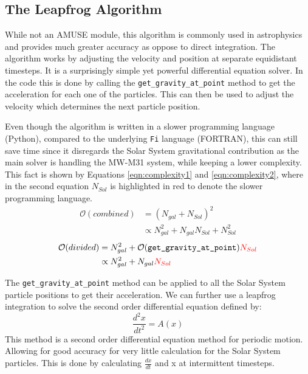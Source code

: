 \documentclass[a4paper,12pt, english]{article}
\begin{document}
\subsection{The Leapfrog Algorithm}
\label{leapfrog}
While not an AMUSE module, this algorithm is commonly used in astrophysics and provides much greater accuracy as oppose to direct integration. The algorithm works by adjusting the velocity and position at separate equidistant timesteps. It is a surprisingly simple yet powerful differential equation solver. In the code this is done by calling the \texttt{get\_gravity\_at\_point} method to get the acceleration for each one of the particles. This can then be used to adjust the velocity which determines the next particle position.\par
\smallskip
Even though the algorithm is written in a slower programming language (Python), compared to the underlying \texttt{Fi} language (FORTRAN), this can still save time since it disregards the Solar System gravitational contribution as the main solver is handling the MW-M31 system, while keeping a lower complexity. This fact is shown by Equations \ref{eqn:complexity1} and \ref{eqn:complexity2}, where in the second equation $N_{Sol}$ is highlighted in red to denote the slower programming language.
\begin{align}
    \mathcal{O}(combined) &= (N_{gal}+N_{Sol})^2 \nonumber \\ 
    &\propto N_{gal}^2 + N_{gal}N_{Sol} + N_{Sol}^2 \label{eqn:complexity1}
\end{align}
\begin{align}
    \mathcal{O}(divided) &= N_{gal}^2 +  \mathcal{O}(\texttt{get\_gravity\_at\_point})\textcolor{red}{N_{Sol}} \nonumber \\
    &\propto N_{gal}^2 + N_{gal}\textcolor{red}{N_{Sol}} \label{eqn:complexity2}
\end{align}\par
\smallskip
The \texttt{get\_gravity\_at\_point} method can be applied to all the Solar System particle positions to get their acceleration. We can further use a leapfrog integration to solve the second order differential equation defined by:
\begin{equation}
    \frac{d^2x}{dt^2} = A(x)
\end{equation}
This method is a second order differential equation method for periodic motion. Allowing for good accuracy for very little calculation for the Solar System particles. This is done by calculating $\frac{dx}{dt}$ and x at intermittent timesteps.\par
\end{document}

